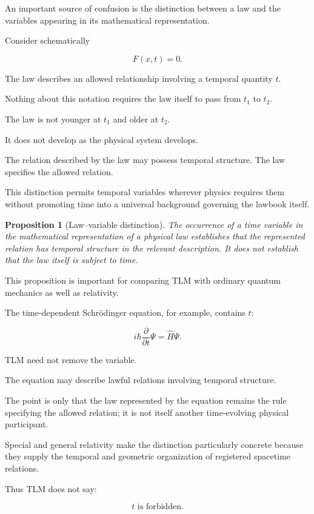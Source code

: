 \documentclass[12pt,onecolumn]{article}
\theoremstyle{plain}
\newtheorem{proposition}{Proposition}
\theoremstyle{definition}
\theoremstyle{remark}
\begin{document}
An important source of confusion is the distinction between a law and the
variables appearing in its mathematical representation.

Consider schematically

\[
F(x,t)=0.
\]

The law describes an allowed relationship involving a temporal quantity
\(t\).

Nothing about this notation requires the law itself to pass from \(t_1\)
to \(t_2\).

The law is not younger at \(t_1\) and older at \(t_2\).

It does not develop as the physical system develops.

The relation described by the law may possess temporal structure. The law
specifies the allowed relation.

This distinction permits temporal variables wherever physics requires them
without promoting time into a universal background governing the lawbook
itself.

\begin{proposition}[Law--variable distinction]
\label{prop:lawvariable}
The occurrence of a time variable in the mathematical representation of a
physical law establishes that the represented relation has temporal
structure in the relevant description. It does not establish that the law
itself is subject to time.
\end{proposition}

This proposition is important for comparing TLM with ordinary quantum
mechanics as well as relativity.

The time-dependent Schr\"odinger equation, for example, contains \(t\):

\[
i\hbar\frac{\partial}{\partial t}\Psi
=
\hat H\Psi.
\]

TLM need not remove the variable.

The equation may describe lawful relations involving temporal structure.

The point is only that the law represented by the equation remains the rule
specifying the allowed relation; it is not itself another time-evolving
physical participant.

Special and general relativity make the distinction particularly concrete
because they supply the temporal and geometric organization of registered
spacetime relations.

Thus TLM does not say:

\[
t \text{ is forbidden}.
\]
\end{document}
